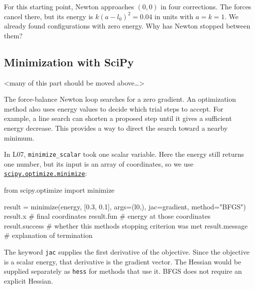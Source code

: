 \documentclass[
  11pt,
  letterpaper,
  DIV=11,
  numbers=noendperiod]{scrartcl}
\newenvironment{Shaded}{\begin{snugshade}}{\end{snugshade}}
\newcommand{\CommentTok}[1]{\textcolor[rgb]{0.37,0.37,0.37}{#1}}
\newcommand{\FloatTok}[1]{\textcolor[rgb]{0.68,0.00,0.00}{#1}}
\newcommand{\ImportTok}[1]{\textcolor[rgb]{0.00,0.46,0.62}{#1}}
\newcommand{\NormalTok}[1]{\textcolor[rgb]{0.00,0.23,0.31}{#1}}
\newcommand{\OperatorTok}[1]{\textcolor[rgb]{0.37,0.37,0.37}{#1}}
\newcommand{\StringTok}[1]{\textcolor[rgb]{0.13,0.47,0.30}{#1}}
\begin{document}
For this starting point, Newton approaches \((0,0)\) in four
corrections. The forces cancel there, but its energy is
\(k(a-l_0)^2=0.04\) in units with \(a=k=1\). We already found
configurations with zero energy. Why has Newton stopped between them?

\subsection{Minimization with SciPy}\label{minimization-with-scipy}

\textless many of this part should be moved above\ldots\textgreater{}

The force-balance Newton loop searches for a zero gradient. An
optimization method also uses energy values to decide which trial steps
to accept. For example, a line search can shorten a proposed step until
it gives a sufficient energy decrease. This provides a way to direct the
search toward a nearby minimum.

In L07, \texttt{minimize\_scalar} took one scalar variable. Here the
energy still returns one number, but its input is an array of
coordinates, so we use
\href{https://docs.scipy.org/doc/scipy/reference/generated/scipy.optimize.minimize.html}{\texttt{scipy.optimize.minimize}}:

\begin{Shaded}
\begin{Highlighting}[]
\ImportTok{from}\NormalTok{ scipy.optimize }\ImportTok{import}\NormalTok{ minimize}

\NormalTok{result }\OperatorTok{=}\NormalTok{ minimize(energy, [}\FloatTok{0.3}\NormalTok{, }\FloatTok{0.1}\NormalTok{], args}\OperatorTok{=}\NormalTok{(l0,),}
\NormalTok{                  jac}\OperatorTok{=}\NormalTok{gradient, method}\OperatorTok{=}\StringTok{"BFGS"}\NormalTok{)}
\NormalTok{result.x       }\CommentTok{\# final coordinates}
\NormalTok{result.fun     }\CommentTok{\# energy at those coordinates}
\NormalTok{result.success }\CommentTok{\# whether this method\textquotesingle{}s stopping criterion was met}
\NormalTok{result.message }\CommentTok{\# explanation of termination}
\end{Highlighting}
\end{Shaded}

The keyword \texttt{jac} supplies the first derivative of the objective.
Since the objective is a scalar energy, that derivative is the gradient
vector. The Hessian would be supplied separately as \texttt{hess} for
methods that use it. BFGS does not require an explicit Hessian.
\end{document}
